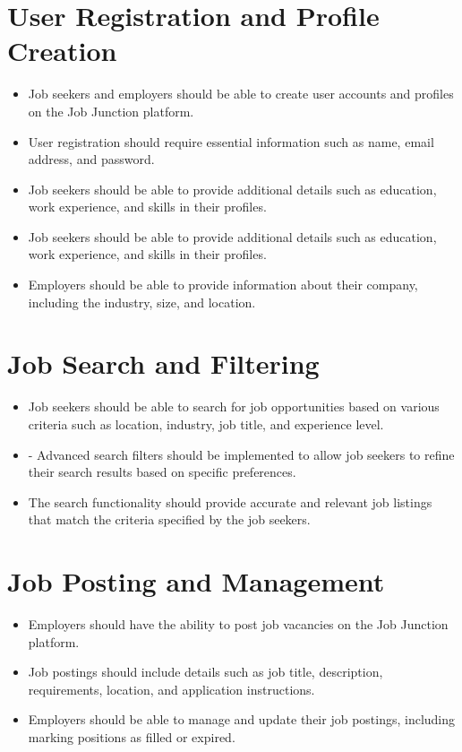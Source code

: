 \documentclass[a4paper,11pt]{report}
\begin{document}
\section{User Registration and Profile Creation}
\begin{itemize}
  \item Job seekers and employers should be able to create user accounts and profiles on the Job Junction
platform.
  \item User registration should require essential information such as name, email address, and password.
  \item  Job seekers should be able to provide additional details such as education, work experience, and
skills in their profiles.
	\item  Job seekers should be able to provide additional details such as education, work experience, and
skills in their profiles.
\item Employers should be able to provide information about their company, including the industry, size,
and location.
\end{itemize}

\section{Job Search and Filtering}
\begin{itemize}
  \item Job seekers should be able to search for job opportunities based on various criteria such as location,
industry, job title, and experience level.
\item - Advanced search filters should be implemented to allow job seekers to refine their search results
based on specific preferences.
\item The search functionality should provide accurate and relevant job listings that match the criteria
specified by the job seekers.
\end{itemize}

\section{Job Posting and Management}
\begin{itemize}
  \item Employers should have the ability to post job vacancies on the Job Junction platform.
  \item Job postings should include details such as job title, description, requirements, location, and
application instructions.
\item Employers should be able to manage and update their job postings, including marking positions as
filled or expired.
\end{itemize}
\end{document}
